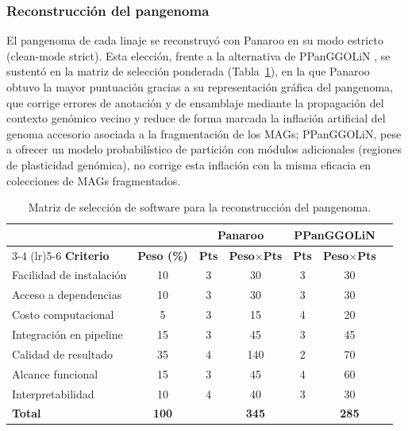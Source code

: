 \subsubsection{Reconstrucción del pangenoma}

El pangenoma de cada linaje se reconstruyó con Panaroo \cite{panaroo2020} en su modo estricto (clean-mode strict). Esta elección, frente a la alternativa de PPanGGOLiN \cite{ppanggolin2020}, se sustentó en la matriz de selección ponderada (Tabla~\ref{tab:seleccion_pangenoma}), en la que Panaroo obtuvo la mayor puntuación gracias a su representación gráfica del pangenoma, que corrige errores de anotación y de ensamblaje mediante la propagación del contexto genómico vecino y reduce de forma marcada la inflación artificial del genoma accesorio asociada a la fragmentación de los MAGs; PPanGGOLiN, pese a ofrecer un modelo probabilístico de partición con módulos adicionales (regiones de plasticidad genómica), no corrige esta inflación con la misma eficacia en colecciones de MAGs fragmentados.

\begin{table}[H]
\centering
\footnotesize
\caption{Matriz de selección de software para la reconstrucción del pangenoma.}
\label{tab:seleccion_pangenoma}
\begin{tabular}{@{}lcccccc@{}}
\toprule
& & \multicolumn{2}{c}{\textbf{Panaroo}} & \multicolumn{2}{c}{\textbf{PPanGGOLiN}} \\
\cmidrule(lr){3-4} \cmidrule(lr){5-6}
\textbf{Criterio} & \textbf{Peso (\%)} & \textbf{Pts} & \textbf{Peso$\times$Pts} & \textbf{Pts} & \textbf{Peso$\times$Pts} \\
\midrule
Facilidad de instalación & 10 & 3 & 30  & 3 & 30 \\
Acceso a dependencias    & 10 & 3 & 30  & 3 & 30 \\
Costo computacional      & 5  & 3 & 15  & 4 & 20 \\
Integración en pipeline  & 15 & 3 & 45  & 3 & 45 \\
Calidad de resultado     & 35 & 4 & 140 & 2 & 70 \\
Alcance funcional        & 15 & 3 & 45  & 4 & 60 \\
Interpretabilidad        & 10 & 4 & 40  & 3 & 30 \\
\midrule
\textbf{Total} & \textbf{100} & & \textbf{345} & & \textbf{285} \\
\bottomrule
\end{tabular}
\end{table}

